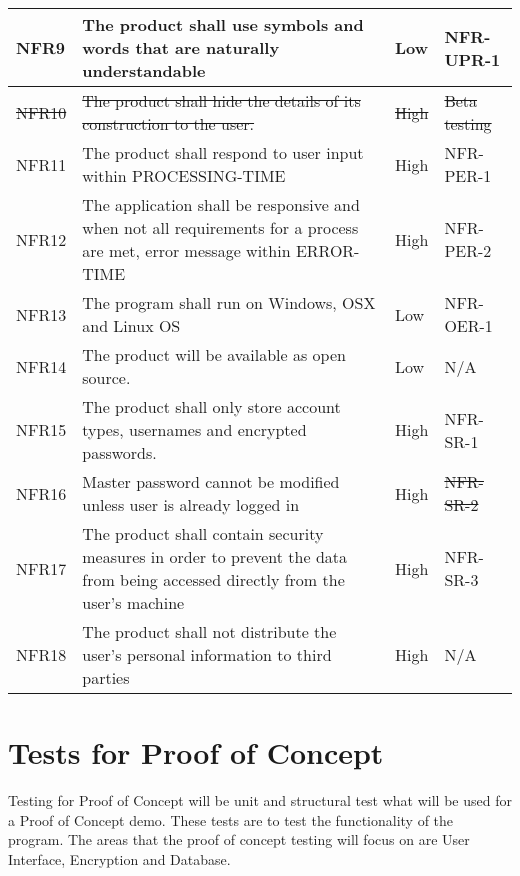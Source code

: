 \documentclass[12pt, titlepage]{article}
\begin{document}
\begin{table}[!htbp]
    \begin{tabularx}{\textwidth}{p{2cm}Xp{2cm}X}
        \midrule

        NFR9  & The product shall use symbols and words that are naturally understandable & Low & NFR-UPR-1\\\hline
        \sout{NFR10} & \sout{The product shall hide the details of its construction to the user.} & \sout{High} & \sout{Beta testing}\\\hline
        NFR11 & The product shall respond to user input within PROCESSING-TIME & High & NFR-PER-1\\\hline
        NFR12 & The application shall be responsive and when not all requirements for a process are met, error message within ERROR-TIME & High & NFR-PER-2\\\hline
        NFR13 & The program shall run on Windows, OSX and Linux OS & Low & NFR-OER-1\\\hline
        NFR14 & The product will be available as open source. & Low & N/A\\\hline
        NFR15 & The product shall only store account types, usernames and encrypted passwords. & High & NFR-SR-1\\\hline
        NFR16 & Master password cannot be modified unless user is already logged in & High & \sout{NFR-SR-2}\\\hline
        NFR17 & The product shall contain security measures in order to prevent the data from being accessed directly from the user’s machine & High & NFR-SR-3\\\hline
        NFR18 & The product shall not distribute the user’s personal information to third parties & High & N/A\\

        \bottomrule

    \end{tabularx}
\end{table}

\section{Tests for Proof of Concept}

Testing for Proof of Concept will be unit and structural test what will be used for a Proof of Concept demo. These tests are to test the functionality of the program. The areas that the proof of concept testing will focus on are User Interface, Encryption and Database.
\end{document}
